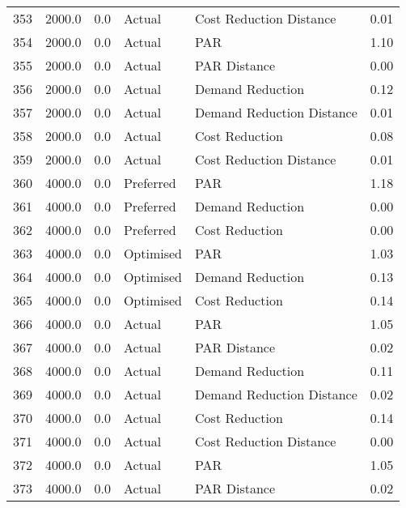 \begin{longtable}{lrrllr}
353  &       2000.0 &     0.0 &         Actual &    Cost Reduction Distance &   0.01 \\
354  &       2000.0 &     0.0 &         Actual &                        PAR &   1.10 \\
355  &       2000.0 &     0.0 &         Actual &               PAR Distance &   0.00 \\
356  &       2000.0 &     0.0 &         Actual &           Demand Reduction &   0.12 \\
357  &       2000.0 &     0.0 &         Actual &  Demand Reduction Distance &   0.01 \\
358  &       2000.0 &     0.0 &         Actual &             Cost Reduction &   0.08 \\
359  &       2000.0 &     0.0 &         Actual &    Cost Reduction Distance &   0.01 \\
360  &       4000.0 &     0.0 &      Preferred &                        PAR &   1.18 \\
361  &       4000.0 &     0.0 &      Preferred &           Demand Reduction &   0.00 \\
362  &       4000.0 &     0.0 &      Preferred &             Cost Reduction &   0.00 \\
363  &       4000.0 &     0.0 &      Optimised &                        PAR &   1.03 \\
364  &       4000.0 &     0.0 &      Optimised &           Demand Reduction &   0.13 \\
365  &       4000.0 &     0.0 &      Optimised &             Cost Reduction &   0.14 \\
366  &       4000.0 &     0.0 &         Actual &                        PAR &   1.05 \\
367  &       4000.0 &     0.0 &         Actual &               PAR Distance &   0.02 \\
368  &       4000.0 &     0.0 &         Actual &           Demand Reduction &   0.11 \\
369  &       4000.0 &     0.0 &         Actual &  Demand Reduction Distance &   0.02 \\
370  &       4000.0 &     0.0 &         Actual &             Cost Reduction &   0.14 \\
371  &       4000.0 &     0.0 &         Actual &    Cost Reduction Distance &   0.00 \\
372  &       4000.0 &     0.0 &         Actual &                        PAR &   1.05 \\
373  &       4000.0 &     0.0 &         Actual &               PAR Distance &   0.02 \\

\end{longtable}
